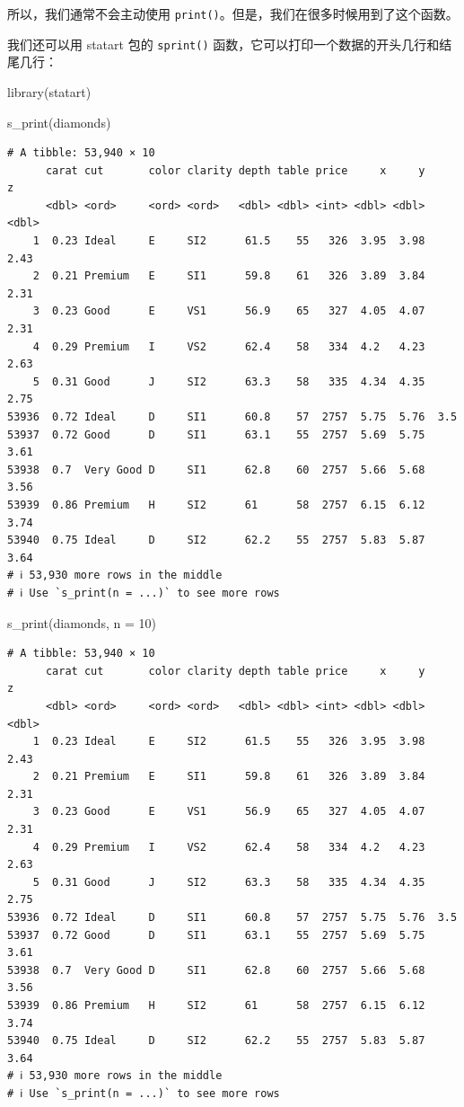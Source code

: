 \documentclass[
  letterpaper,
]{ctexbook}
\newenvironment{Shaded}{\begin{snugshade}}{\end{snugshade}}
\newcommand{\AttributeTok}[1]{\textcolor[rgb]{0.40,0.45,0.13}{#1}}
\newcommand{\DecValTok}[1]{\textcolor[rgb]{0.68,0.00,0.00}{#1}}
\newcommand{\FunctionTok}[1]{\textcolor[rgb]{0.28,0.35,0.67}{#1}}
\newcommand{\NormalTok}[1]{\textcolor[rgb]{0.00,0.23,0.31}{#1}}
\begin{document}
所以，我们通常不会主动使用
\texttt{print()}。但是，我们在很多时候用到了这个函数。

我们还可以用 statart 包的 \texttt{sprint()}
函数，它可以打印一个数据的开头几行和结尾几行：

\begin{Shaded}
\begin{Highlighting}[]
\FunctionTok{library}\NormalTok{(statart)}

\FunctionTok{s\_print}\NormalTok{(diamonds)}
\end{Highlighting}
\end{Shaded}

\begin{verbatim}
# A tibble: 53,940 × 10
      carat cut       color clarity depth table price     x     y     z
      <dbl> <ord>     <ord> <ord>   <dbl> <dbl> <int> <dbl> <dbl> <dbl>
    1  0.23 Ideal     E     SI2      61.5    55   326  3.95  3.98  2.43
    2  0.21 Premium   E     SI1      59.8    61   326  3.89  3.84  2.31
    3  0.23 Good      E     VS1      56.9    65   327  4.05  4.07  2.31
    4  0.29 Premium   I     VS2      62.4    58   334  4.2   4.23  2.63
    5  0.31 Good      J     SI2      63.3    58   335  4.34  4.35  2.75
53936  0.72 Ideal     D     SI1      60.8    57  2757  5.75  5.76  3.5 
53937  0.72 Good      D     SI1      63.1    55  2757  5.69  5.75  3.61
53938  0.7  Very Good D     SI1      62.8    60  2757  5.66  5.68  3.56
53939  0.86 Premium   H     SI2      61      58  2757  6.15  6.12  3.74
53940  0.75 Ideal     D     SI2      62.2    55  2757  5.83  5.87  3.64
# ℹ 53,930 more rows in the middle
# ℹ Use `s_print(n = ...)` to see more rows
\end{verbatim}

\begin{Shaded}
\begin{Highlighting}[]
\FunctionTok{s\_print}\NormalTok{(diamonds, }\AttributeTok{n =} \DecValTok{10}\NormalTok{)}
\end{Highlighting}
\end{Shaded}

\begin{verbatim}
# A tibble: 53,940 × 10
      carat cut       color clarity depth table price     x     y     z
      <dbl> <ord>     <ord> <ord>   <dbl> <dbl> <int> <dbl> <dbl> <dbl>
    1  0.23 Ideal     E     SI2      61.5    55   326  3.95  3.98  2.43
    2  0.21 Premium   E     SI1      59.8    61   326  3.89  3.84  2.31
    3  0.23 Good      E     VS1      56.9    65   327  4.05  4.07  2.31
    4  0.29 Premium   I     VS2      62.4    58   334  4.2   4.23  2.63
    5  0.31 Good      J     SI2      63.3    58   335  4.34  4.35  2.75
53936  0.72 Ideal     D     SI1      60.8    57  2757  5.75  5.76  3.5 
53937  0.72 Good      D     SI1      63.1    55  2757  5.69  5.75  3.61
53938  0.7  Very Good D     SI1      62.8    60  2757  5.66  5.68  3.56
53939  0.86 Premium   H     SI2      61      58  2757  6.15  6.12  3.74
53940  0.75 Ideal     D     SI2      62.2    55  2757  5.83  5.87  3.64
# ℹ 53,930 more rows in the middle
# ℹ Use `s_print(n = ...)` to see more rows
\end{verbatim}
\end{document}
